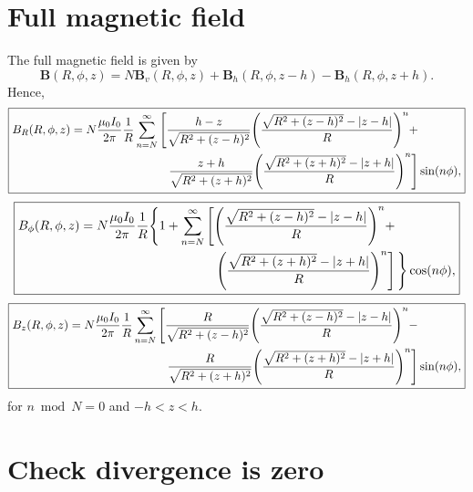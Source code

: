 \documentclass{article}
\let\vec\mathbf
\begin{document}
\section{Full magnetic field}

The full magnetic field is given by
\[\mathbf{B}(R,\phi,z) = N\vec{B}_{v}(R, \phi, z) + \vec{B}_h(R, \phi, z-h) - \vec{B}_h(R, \phi, z+h).\]
Hence,
\[\boxed{
\begin{aligned}
B_R(R,\phi,z) = N\frac{\mu_0 I_0}{2 \pi}\frac{1}{R}\sum_{n=N}^{\infty}&\left[\frac{h-z}{\sqrt{R^2+(z-h)^2}}\qty(\frac{\sqrt{R^2+(z-h)^2}-\abs{z-h}}{R})^n+\right. \\
&\ \ \left.\frac{z+h}{\sqrt{R^2+(z+h)^2}}\qty(\frac{\sqrt{R^2+(z+h)^2}-\abs{z+h}}{R})^n\right]\sin(n\phi),
\end{aligned}
}\]
\[\boxed{
\begin{aligned}
B_\phi(R,\phi,z) = N\frac{\mu_0 I_0}{2 \pi}\frac{1}{R}\Bigg\{1+\sum_{n=N}^{\infty}&\left[\qty(\frac{\sqrt{R^2+(z-h)^2}-\abs{z-h}}{R})^n+\right. \\
&\ \ \left.\qty(\frac{\sqrt{R^2+(z+h)^2}-\abs{z+h}}{R})^n\right]\Bigg\}\cos(n\phi),
\end{aligned}
}\]
\[\boxed{
\begin{aligned}
B_z(R,\phi,z) = N\frac{\mu_0 I_0}{2 \pi}\frac{1}{R}\sum_{n=N}^{\infty}&\left[\frac{R}{\sqrt{R^2+(z-h)^2}}\qty(\frac{\sqrt{R^2+(z-h)^2}-\abs{z-h}}{R})^n-\right. \\
&\ \ \left.\frac{R}{\sqrt{R^2+(z+h)^2}}\qty(\frac{\sqrt{R^2+(z+h)^2}-\abs{z+h}}{R})^n\right]\sin(n\phi),
\end{aligned}
}\]
for $n \bmod N =0$ and $-h<z<h$.

\section{Check divergence is zero}
\end{document}
